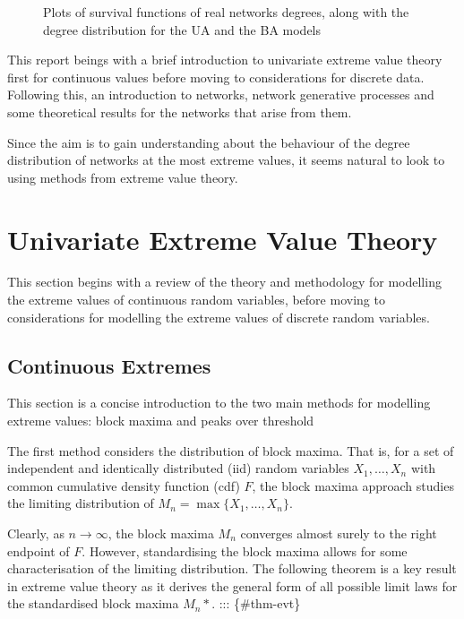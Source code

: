 \documentclass[
  10pt,
  a4paper,
]{scrreprt}
\theoremstyle{plain}
\theoremstyle{definition}
\theoremstyle{plain}
\theoremstyle{remark}
\begin{document}
{\begin{figure}[H]
{}

\caption{\label{fig-survs1}Plots of survival functions of real networks
degrees, along with the degree distribution for the UA and the BA
models}

\end{figure}

This report beings with a brief introduction to univariate extreme value
theory first for continuous values before moving to considerations for
discrete data. Following this, an introduction to networks, network
generative processes and some theoretical results for the networks that
arise from them.

Since the aim is to gain understanding about the behaviour of the degree
distribution of networks at the most extreme values, it seems natural to
look to using methods from extreme value theory.

\hypertarget{sec-ext}{%
\chapter{Univariate Extreme Value Theory}\label{sec-ext}}

This section begins with a review of the theory and methodology for
modelling the extreme values of continuous random variables, before
moving to considerations for modelling the extreme values of discrete
random variables.

\hypertarget{sec-ce}{%
\section{Continuous Extremes}\label{sec-ce}}

This section is a concise introduction to the two main methods for
modelling extreme values: block maxima and peaks over threshold

The first method considers the distribution of block maxima. That is,
for a set of independent and identically distributed (iid) random
variables \(X_1,\ldots,X_n\) with common cumulative density function
(cdf) \(F\), the block maxima approach studies the limiting distribution
of \(M_n = \max\{X_1,\ldots,X_n\}\).

Clearly, as \(n\rightarrow \infty\), the block maxima \(M_n\) converges
almost surely to the right endpoint of \(F\). However, standardising the
block maxima allows for some characterisation of the limiting
distribution. The following theorem is a key result in extreme value
theory as it derives the general form of all possible limit laws for the
standardised block maxima \(M_n*\). ::: \{\#thm-evt\}

}
\end{document}
